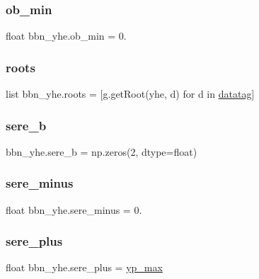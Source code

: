 \subsubsection{\texorpdfstring{ob\+\_\+min}{ob\_min}}
{\footnotesize\ttfamily float bbn\+\_\+yhe.\+ob\+\_\+min = 0.}

\mbox{\label{namespacebbn__yhe_ab2add45031a3e0b76e777d91fd6eff67}} 
\subsubsection{\texorpdfstring{roots}{roots}}
{\footnotesize\ttfamily list bbn\+\_\+yhe.\+roots = \mbox{[}g.\+get\+Root(\textquotesingle{}yhe\textquotesingle{}, d) for d in \mbox{\hyperlink{namespacebbn__yhe_a063490560da67d4aa74baa317b66577a}{datatag}}\mbox{]}}

\mbox{\label{namespacebbn__yhe_a0189ca7d3d30cadc352fe3c5f419d73a}} 
\subsubsection{\texorpdfstring{sere\+\_\+b}{sere\_b}}
{\footnotesize\ttfamily bbn\+\_\+yhe.\+sere\+\_\+b = np.\+zeros(2, dtype=\textquotesingle{}float\textquotesingle{})}

\mbox{\label{namespacebbn__yhe_ad00e51b24c6c009e64a8baa0f0b51ad8}} 
\subsubsection{\texorpdfstring{sere\+\_\+minus}{sere\_minus}}
{\footnotesize\ttfamily float bbn\+\_\+yhe.\+sere\+\_\+minus = 0.}

\mbox{\label{namespacebbn__yhe_a8c95d448cd274ce585cfaf255bd4ff1b}} 
\subsubsection{\texorpdfstring{sere\+\_\+plus}{sere\_plus}}
{\footnotesize\ttfamily float bbn\+\_\+yhe.\+sere\+\_\+plus = \mbox{\hyperlink{namespacebbn__yhe_a1b95d70c9d6b84360f839ed708b14c72}{yp\+\_\+max}}}

